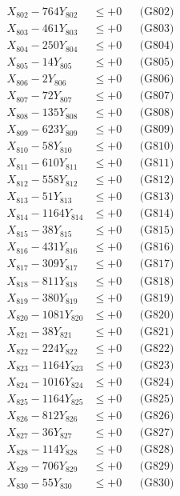 \documentclass[a4paper,10pt]{article}
\begin{document}
{\begin{align}
X_{802} - 764Y_{802} &\leq +0 && \text{(G802)} \\
X_{803} - 461Y_{803} &\leq +0 && \text{(G803)} \\
X_{804} - 250Y_{804} &\leq +0 && \text{(G804)} \\
X_{805} - 14Y_{805} &\leq +0 && \text{(G805)} \\
X_{806} - 2Y_{806} &\leq +0 && \text{(G806)} \\
X_{807} - 72Y_{807} &\leq +0 && \text{(G807)} \\
X_{808} - 135Y_{808} &\leq +0 && \text{(G808)} \\
X_{809} - 623Y_{809} &\leq +0 && \text{(G809)} \\
X_{810} - 58Y_{810} &\leq +0 && \text{(G810)} \\
\allowbreak
X_{811} - 610Y_{811} &\leq +0 && \text{(G811)} \\
X_{812} - 558Y_{812} &\leq +0 && \text{(G812)} \\
X_{813} - 51Y_{813} &\leq +0 && \text{(G813)} \\
X_{814} - 1164Y_{814} &\leq +0 && \text{(G814)} \\
X_{815} - 38Y_{815} &\leq +0 && \text{(G815)} \\
X_{816} - 431Y_{816} &\leq +0 && \text{(G816)} \\
X_{817} - 309Y_{817} &\leq +0 && \text{(G817)} \\
X_{818} - 811Y_{818} &\leq +0 && \text{(G818)} \\
X_{819} - 380Y_{819} &\leq +0 && \text{(G819)} \\
X_{820} - 1081Y_{820} &\leq +0 && \text{(G820)} \\
\allowbreak
X_{821} - 38Y_{821} &\leq +0 && \text{(G821)} \\
X_{822} - 224Y_{822} &\leq +0 && \text{(G822)} \\
X_{823} - 1164Y_{823} &\leq +0 && \text{(G823)} \\
X_{824} - 1016Y_{824} &\leq +0 && \text{(G824)} \\
X_{825} - 1164Y_{825} &\leq +0 && \text{(G825)} \\
X_{826} - 812Y_{826} &\leq +0 && \text{(G826)} \\
X_{827} - 36Y_{827} &\leq +0 && \text{(G827)} \\
X_{828} - 114Y_{828} &\leq +0 && \text{(G828)} \\
X_{829} - 706Y_{829} &\leq +0 && \text{(G829)} \\
X_{830} - 55Y_{830} &\leq +0 && \text{(G830)} \\

\end{align}}
\end{document}
